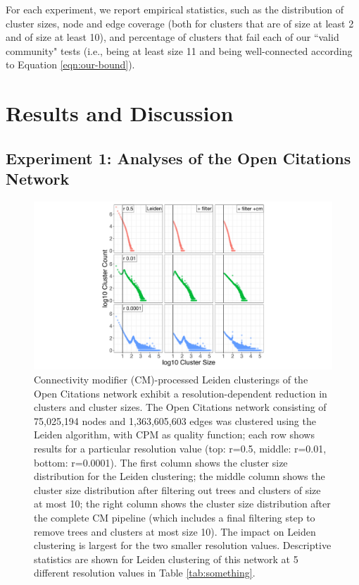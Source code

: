 \documentclass[11pt]{article}   	%
\begin{document}
For each experiment, we report empirical statistics, such as the distribution of cluster sizes, node and edge coverage (both for clusters that are of size at least 2 and of size at least 10), and percentage of clusters that fail each of our ``valid community" tests (i.e., being at least size 11 and being well-connected according to Equation \ref{eqn:our-bound}).

\section{Results and Discussion}
\label{sec:results-discussion}

\subsection{Experiment 1: Analyses of the Open Citations Network}

\begin{figure}[H]
\centering
\includegraphics[width=0.8\linewidth]{figs/fig1_kn.pdf}
\caption{Connectivity modifier (CM)-processed Leiden clusterings of the Open Citations network exhibit a resolution-dependent reduction in clusters and cluster sizes. 
The Open Citations network consisting of 75,025,194 nodes and 1,363,605,603 edges was clustered using the Leiden algorithm, with CPM as quality function; each row shows results for a particular resolution value (top: r=0.5, middle: r=0.01, bottom: r=0.0001).  
The first column shows the cluster size distribution for the Leiden clustering; the middle column shows the cluster size distribution after filtering out trees and clusters of size at most 10; the right column shows the cluster size distribution after the complete CM pipeline (which includes a final filtering step to remove trees and clusters at most size 10). 
The impact on Leiden clustering is largest for the two smaller resolution values. 
Descriptive statistics are shown for Leiden clustering of this network at 5 different resolution values in Table \ref{tab:something}.}
\label{fig:oc_size_count_plots}
\end{figure}
\end{document}

